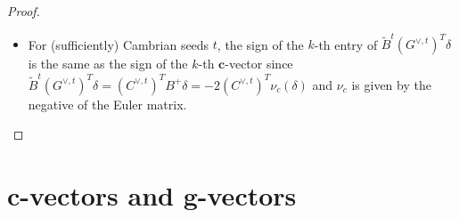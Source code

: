 \documentclass{amsart}
\numberwithin{theorem}{section}
\newcommand{\bfc}{\boldsymbol{c}}
\newcommand{\bfg}{\boldsymbol{g}}
\begin{document}
\begin{proof}
\begin{itemize}
\begin{itemize}
            \emph{proof}: Since $A^t:=(C^{\vee,t})^T A_0 C^t$ then $G^t A^t (G^{\vee,t})^T:=A_0$. Since $G^t $ is invertible $A_0\cdot \delta = 0$ implies $A^t (G^{\vee,t})^T \cdot \delta = 0$ i.e. $(G^{\vee,t})^T \cdot \delta$ spans the kernel of $A^t$. After sufficiently many coxeter all the g-vectors at $t$ are on the positive side of $\delta^\perp$ and the result follows.
          \item for $t'$ connected to $t$ by mutation in direction $k$, we want $\eta_k^{\widetilde B^t}(\widetilde B^t\cdot\kappa_t)=\widetilde B^{t'}\cdot\kappa_{t'}$
          \item $\eta_k^{\widetilde B^t}(\widetilde B^t\cdot\kappa_t)=\widetilde E^t_{k,\varepsilon}\widetilde B^t\cdot\kappa_t=\widetilde E^t_{k,\varepsilon}\widetilde B^t F^t_{k,\varepsilon} F^t_{k,\varepsilon}\cdot\kappa_t = \widetilde B^{t'} \cdot F^t_{k,\varepsilon} \kappa_t $ but $\kappa_{t'}= F^t_{k,\varepsilon_{trop}} \kappa_t$
          \item For Cambrian mutations, $\varepsilon_{trop}$ is always positive.
            This follows from the explicit formula for $\bfc$-vectors in \cite{cambrian_frameworks} after Prop. 5.4.
          \item The $k$-th row of $F^t_{k,+}+F^t_{k,-}$ is the negative of the $k$-th row of the associated Cartan companion (not quasi)
          \item The $k$-th row of $F^t_{k,-}-F^t_{k,+}$ is the $k$-th row of $\widetilde B^t$
          \item The $k$-th entries of $\widetilde B^{t'} \cdot F^t_{k,\varepsilon} \kappa_t$ and $\widetilde B^{t'} \cdot \kappa_{t'}$ are the same
          \item $A^t:=(C^{\vee,t})^T A_0 C^t$
          \item $A^{t'}=(F^{t,\vee}_{k,\varepsilon_{trop}})^T A_t F^t_{k,\varepsilon_{trop}}$
        \end{itemize}
      \item For (sufficiently) Cambrian seeds $t$, the sign of the $k$-th entry of $\widetilde B^t (G^{\vee,t})^T \delta$ is the same as the sign of the $k$-th $\bfc$-vector since $\widetilde B^t (G^{\vee,t})^T \delta=(C^{\vee,t})^T B^+ \delta = -2 (C^{\vee,t})^T \nu_c(\delta)$ and $\nu_c$ is given by the negative of the Euler matrix.
    \end{itemize}

  \end{proof}

  \section{$\bfc$-vectors and $\bfg$-vectors}
\end{document}
